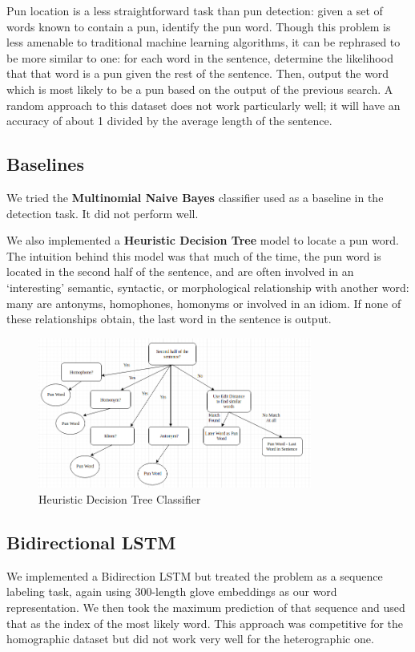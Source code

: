 \documentclass{article}
\begin{document}
Pun location is a less straightforward task than pun detection: given a set of
words known to contain a pun, identify the pun word. Though this problem is less
amenable to traditional machine learning algorithms, it can be rephrased to be
more similar to one: for each word in the sentence, determine the likelihood
that that word is a pun given the rest of the sentence. Then, output the word
which is most likely to be a pun based on the output of the previous search.  A
random approach to this dataset does not work particularly well; it will have an
accuracy of about 1 divided by the average length of the sentence.
 
\subsection{Baselines}

We tried the \textbf{Multinomial Naive Bayes} classifier used as a baseline in
the detection task. It did not perform well.


We also implemented a \textbf{Heuristic Decision Tree} model to locate a pun
word. The intuition behind this model was that much of the time, the pun word
is located in the second half of the sentence, and are often involved in an
`interesting' semantic, syntactic, or morphological relationship with another
word: many are antonyms, homophones, homonyms or involved in an idiom. If none
of these relationships obtain, the last word in the sentence is output.

\begin{figure}[h!]
\centering
\includegraphics[width=90mm]{decision_tree.png}
\caption{Heuristic Decision Tree Classifier}
\label{fig:method}
\end{figure}

\subsection{Bidirectional LSTM}

We implemented a Bidirection LSTM but treated the problem as a sequence labeling
task, again using 300-length glove embeddings as our word representation. We
then took the maximum prediction of that sequence and used that as the index of
the most likely word. This approach was competitive for the homographic dataset
but did not work very well for the heterographic one.
\end{document}
